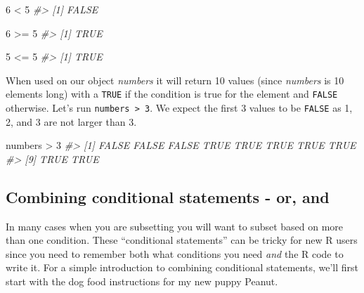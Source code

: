\documentclass[
]{krantz}
\makeatletter
\newenvironment{Shaded}{\begin{snugshade}}{\end{snugshade}}
\newcommand{\CommentTok}[1]{\textcolor[rgb]{0.37,0.37,0.37}{\textit{#1}}}
\newcommand{\DecValTok}[1]{\textcolor[rgb]{0.06,0.06,0.06}{#1}}
\newcommand{\NormalTok}[1]{#1}
\newcommand{\SpecialCharTok}[1]{\textcolor[rgb]{0,0,0}{#1}}
\newenvironment{kframe}{%
\medskip{}
\setlength{\fboxsep}{.8em}
 \def\at@end@of@kframe{}%
 \ifinner\ifhmode%
  \def\at@end@of@kframe{\end{minipage}}%
  \begin{minipage}{\columnwidth}%
 \fi\fi%
 \def\FrameCommand##1{\hskip\@totalleftmargin \hskip-\fboxsep
 \colorbox{shadecolor}{##1}\hskip-\fboxsep
     \hskip-\linewidth \hskip-\@totalleftmargin \hskip\columnwidth}%
 \MakeFramed {\advance\hsize-\width
   \@totalleftmargin\z@ \linewidth\hsize
   \@setminipage}}%
 {\par\unskip\endMakeFramed%
 \at@end@of@kframe}
\renewenvironment{Shaded}{\begin{kframe}}{\end{kframe}}
\makeatother
\begin{document}
\begin{Shaded}
\begin{Highlighting}[]
\DecValTok{6} \SpecialCharTok{\textless{}} \DecValTok{5}
\CommentTok{\#\textgreater{} [1] FALSE}
\end{Highlighting}
\end{Shaded}

\begin{Shaded}
\begin{Highlighting}[]
\DecValTok{6} \SpecialCharTok{\textgreater{}=} \DecValTok{5}
\CommentTok{\#\textgreater{} [1] TRUE}
\end{Highlighting}
\end{Shaded}

\begin{Shaded}
\begin{Highlighting}[]
\DecValTok{5} \SpecialCharTok{\textless{}=} \DecValTok{5}
\CommentTok{\#\textgreater{} [1] TRUE}
\end{Highlighting}
\end{Shaded}

When used on our object \emph{numbers} it will return 10 values (since \emph{numbers} is 10 elements long) with a \texttt{TRUE} if the condition is true for the element and \texttt{FALSE} otherwise. Let's run \texttt{numbers\ \textgreater{}\ 3}. We expect the first 3 values to be \texttt{FALSE} as 1, 2, and 3 are not larger than 3.

\begin{Shaded}
\begin{Highlighting}[]
\NormalTok{numbers }\SpecialCharTok{\textgreater{}} \DecValTok{3}
\CommentTok{\#\textgreater{}  [1] FALSE FALSE FALSE  TRUE  TRUE  TRUE  TRUE  TRUE}
\CommentTok{\#\textgreater{}  [9]  TRUE  TRUE}
\end{Highlighting}
\end{Shaded}

\hypertarget{combining-conditional-statements---or-and}{%
\subsection{Combining conditional statements - or, and}\label{combining-conditional-statements---or-and}}

In many cases when you are subsetting you will want to subset based on more than one condition. These ``conditional statements'' can be tricky for new R users since you need to remember both what conditions you need \emph{and} the R code to write it. For a simple introduction to combining conditional statements, we'll first start with the dog food instructions for my new puppy Peanut.
\end{document}
